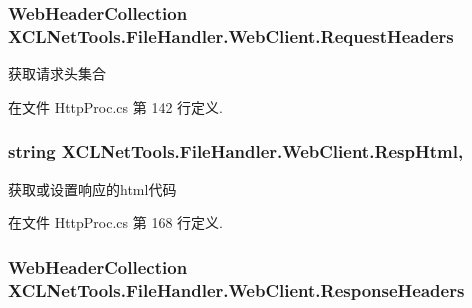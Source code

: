 \subsubsection[{\texorpdfstring{Request\+Headers}{RequestHeaders}}]{\setlength{\rightskip}{0pt plus 5cm}Web\+Header\+Collection X\+C\+L\+Net\+Tools.\+File\+Handler.\+Web\+Client.\+Request\+Headers\hspace{0.3cm}{\ttfamily [get]}}\hypertarget{class_x_c_l_net_tools_1_1_file_handler_1_1_web_client_a89d4bf2af70a2a0991904b1b61c8dd1d}{}\label{class_x_c_l_net_tools_1_1_file_handler_1_1_web_client_a89d4bf2af70a2a0991904b1b61c8dd1d}


获取请求头集合 



在文件 Http\+Proc.\+cs 第 142 行定义.

\subsubsection[{\texorpdfstring{Resp\+Html}{RespHtml}}]{\setlength{\rightskip}{0pt plus 5cm}string X\+C\+L\+Net\+Tools.\+File\+Handler.\+Web\+Client.\+Resp\+Html\hspace{0.3cm}{\ttfamily [get]}, {\ttfamily [set]}}\hypertarget{class_x_c_l_net_tools_1_1_file_handler_1_1_web_client_a67e90e96bd067171c16cb84d75f66c3a}{}\label{class_x_c_l_net_tools_1_1_file_handler_1_1_web_client_a67e90e96bd067171c16cb84d75f66c3a}


获取或设置响应的html代码 



在文件 Http\+Proc.\+cs 第 168 行定义.

\subsubsection[{\texorpdfstring{Response\+Headers}{ResponseHeaders}}]{\setlength{\rightskip}{0pt plus 5cm}Web\+Header\+Collection X\+C\+L\+Net\+Tools.\+File\+Handler.\+Web\+Client.\+Response\+Headers\hspace{0.3cm}{\ttfamily [get]}}\hypertarget{class_x_c_l_net_tools_1_1_file_handler_1_1_web_client_a3d00d3457c23ce30274af963f4cab6bb}{}\label{class_x_c_l_net_tools_1_1_file_handler_1_1_web_client_a3d00d3457c23ce30274af963f4cab6bb}


